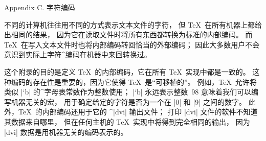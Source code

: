 


\beginappendix Appendix C. 字符编码

\ninepoint
不同的计算机往往用不同的方式表示文本文件的字符，
但 \TeX\ 在所有机器上都给出相同的结果，
因为它在读取文件时将所有东西都转换为标准的内部编码。
而 \TeX\ 在写入文本文件时也将内部编码转回恰当的外部编码；
因此大多数用户不会意识到实际上字符^{编码}在机器中来回转换过。

这个附录的目的是定义 \TeX\ 的内部编码，它在所有 \TeX\ 实现中都是一致的。
这种编码的存在性是重要的，因为它使得 \TeX\ 是``可移植的''。
例如，\TeX\ 允许将类似 |`b| 的^{字母表常数}作为整数使用；
|`b| 永远表示整数~98 意味着我们可以编写机器无关的宏，
用于确定给定的字符是否为一个在 |0| 和 |9| 之间的数字。
此外，\TeX\ 的内部编码还用于它的 ^|dvi| 输出文件；
打印 |dvi| 文件的软件不知道其数据来自哪里，
但在任何主机的 \TeX\ 实现中将得到完全相同的输出，
因为 |dvi| 数据是用机器无关的编码表示的。

